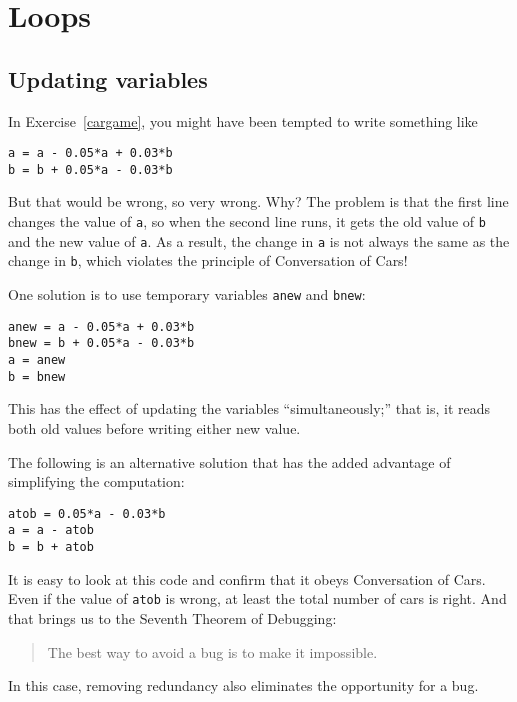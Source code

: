 
\chapter{Loops}

\section{Updating variables}

In Exercise~\ref{cargame}, you might have been tempted to write something
like

\begin{verbatim}
a = a - 0.05*a + 0.03*b
b = b + 0.05*a - 0.03*b
\end{verbatim}

But that would be wrong, so very wrong. Why? The problem is that
the first line changes the value of {\tt a}, so when the second line
runs, it gets the old value of {\tt b} and the new value of {\tt a}.
As a result, the change in {\tt a} is not always the same as the
change in {\tt b}, which violates the principle of Conversation
of Cars!

One solution is to use temporary variables {\tt anew} and {\tt bnew}:

\begin{verbatim}
anew = a - 0.05*a + 0.03*b
bnew = b + 0.05*a - 0.03*b
a = anew
b = bnew
\end{verbatim}

This has the effect of updating the variables ``simultaneously;'' that
is, it reads both old values before writing either new value.

The following is an alternative solution that
has the added advantage of simplifying the computation:

\begin{verbatim}
atob = 0.05*a - 0.03*b
a = a - atob
b = b + atob
\end{verbatim}

It is easy to look at this code and confirm that it obeys Conversation
of Cars. Even if the value of {\tt atob} is wrong, at least the total
number of cars is right. And that brings us to the Seventh Theorem of
Debugging:

\begin{quote}
The best way to avoid a bug is to make it impossible.
\end{quote}

In this case, removing redundancy also eliminates the opportunity for
a bug.


